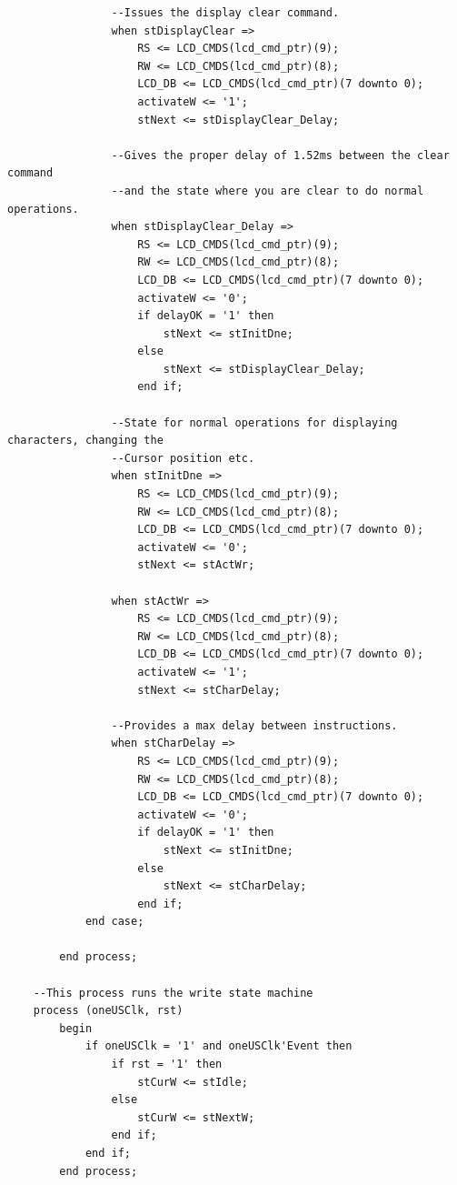 \documentclass[a4paper,12pt,twoside]{article}
\begin{document}
\begin{lstlisting}
                --Issues the display clear command.
                when stDisplayClear	=>
                    RS <= LCD_CMDS(lcd_cmd_ptr)(9);
                    RW <= LCD_CMDS(lcd_cmd_ptr)(8);
                    LCD_DB <= LCD_CMDS(lcd_cmd_ptr)(7 downto 0);
                    activateW <= '1';
                    stNext <= stDisplayClear_Delay;

                --Gives the proper delay of 1.52ms between the clear command
                --and the state where you are clear to do normal operations.
                when stDisplayClear_Delay =>
                    RS <= LCD_CMDS(lcd_cmd_ptr)(9);
                    RW <= LCD_CMDS(lcd_cmd_ptr)(8);
                    LCD_DB <= LCD_CMDS(lcd_cmd_ptr)(7 downto 0);
                    activateW <= '0';
                    if delayOK = '1' then
                        stNext <= stInitDne;
                    else
                        stNext <= stDisplayClear_Delay;
                    end if;
				
                --State for normal operations for displaying characters, changing the
                --Cursor position etc.
                when stInitDne =>		
                    RS <= LCD_CMDS(lcd_cmd_ptr)(9);
                    RW <= LCD_CMDS(lcd_cmd_ptr)(8);
                    LCD_DB <= LCD_CMDS(lcd_cmd_ptr)(7 downto 0);
                    activateW <= '0';
                    stNext <= stActWr;

                when stActWr =>		
                    RS <= LCD_CMDS(lcd_cmd_ptr)(9);
                    RW <= LCD_CMDS(lcd_cmd_ptr)(8);
                    LCD_DB <= LCD_CMDS(lcd_cmd_ptr)(7 downto 0);
                    activateW <= '1';
                    stNext <= stCharDelay;
					
                --Provides a max delay between instructions.
                when stCharDelay =>
                    RS <= LCD_CMDS(lcd_cmd_ptr)(9);
                    RW <= LCD_CMDS(lcd_cmd_ptr)(8);
                    LCD_DB <= LCD_CMDS(lcd_cmd_ptr)(7 downto 0);
                    activateW <= '0';					
                    if delayOK = '1' then
                        stNext <= stInitDne;
                    else
                        stNext <= stCharDelay;
                    end if;
            end case;
		
        end process;					
								   
 	--This process runs the write state machine
	process (oneUSClk, rst)
		begin
			if oneUSClk = '1' and oneUSClk'Event then
				if rst = '1' then
					stCurW <= stIdle;
				else
					stCurW <= stNextW;
				end if;
			end if;
		end process;


\end{lstlisting}
\end{document}
